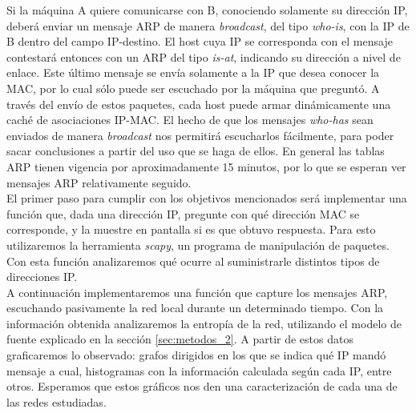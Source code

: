 Si la m\'aquina A quiere comunicarse con B, conociendo solamente su direcci\'on IP, deber\'a enviar un mensaje ARP de manera \emph{broadcast}, del tipo \emph{who-is}, con la IP de B dentro del campo IP-destino. El host cuya IP se corresponda con el mensaje contestar\'a entonces con un ARP del tipo \emph{is-at}, indicando su direcci\'on a nivel de enlace. Este \'ultimo mensaje se env\'ia solamente a la IP que desea conocer la MAC, por lo cual s\'olo puede ser escuchado por la m\'aquina que pregunt\'o. A trav\'es del env\'io de estos paquetes, cada host puede armar din\'amicamente una cach\'e de asociaciones IP-MAC. El hecho de que los mensajes \emph{who-has} sean enviados de manera \emph{broadcast} nos permitir\'a escucharlos f\'acilmente, para poder sacar conclusiones a partir del uso que se haga de ellos. En general las tablas ARP tienen vigencia por aproximadamente 15 minutos, por lo que se esperan ver mensajes ARP relativamente seguido.\\

El primer paso para cumplir con los objetivos mencionados ser\'a implementar una funci\'on que, dada una direcci\'on IP, pregunte con qu\'e direcci\'on MAC se corresponde, y la muestre en pantalla si es que obtuvo respuesta. Para esto utilizaremos la herramienta \emph{scapy}, un programa de manipulaci\'on de paquetes. Con esta funci\'on analizaremos qu\'e ocurre al suministrarle distintos tipos de direcciones IP.\\

A continuaci\'on implementaremos una funci\'on que capture los mensajes ARP, escuchando pasivamente la red local durante un determinado tiempo. Con la informaci\'on obtenida analizaremos la entrop\'ia de la red, utilizando el modelo de fuente explicado en la secci\'on \ref{sec:metodos_2}. A partir de estos datos graficaremos lo observado: grafos dirigidos en los que se indica qu\'e IP mand\'o mensaje a cual, histogramas con la informaci\'on calculada seg\'un cada IP, entre otros. Esperamos que estos gr\'aficos nos den una caracterizaci\'on de cada una de las redes estudiadas.


